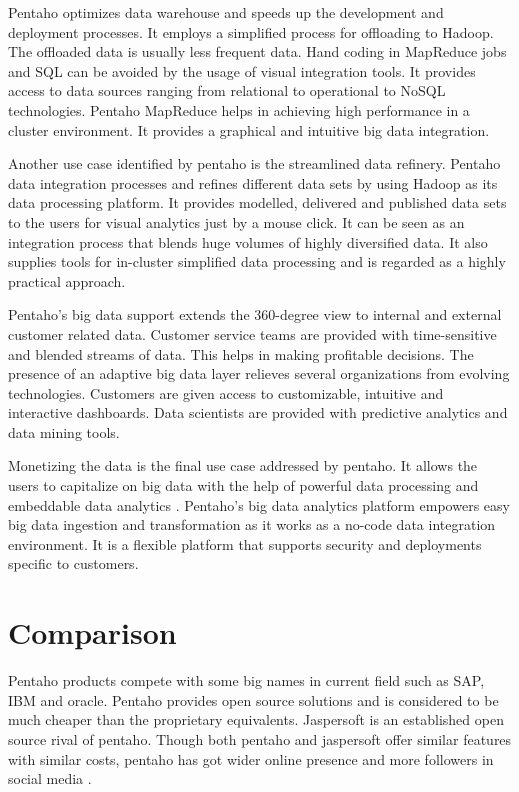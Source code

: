 \documentclass[9pt,twocolumn,twoside]{../../styles/osajnl}
\begin{document}
Pentaho optimizes data warehouse and speeds up the development and
deployment processes. It employs a simplified process for offloading
to Hadoop. The offloaded data is usually less frequent data. Hand
coding in MapReduce jobs and SQL can be avoided by the usage of visual
integration tools. It provides access to data sources ranging from
relational to operational to NoSQL technologies. Pentaho MapReduce
helps in achieving high performance in a cluster environment. It
provides a graphical and intuitive big data integration.

Another use case identified by pentaho is the streamlined data
refinery. Pentaho data integration processes and refines different
data sets by using Hadoop as its data processing platform. It provides
modelled, delivered and published data sets to the users for visual
analytics just by a mouse click. It can be seen as an integration
process that blends huge volumes of highly diversified data. It also
supplies tools for in-cluster simplified data processing and is
regarded as a highly practical approach.

Pentaho’s big data support extends the 360-degree view to internal and
external customer related data. Customer service teams are provided
with time-sensitive and blended streams of data. This helps in making
profitable decisions. The presence of an adaptive big data layer
relieves several organizations from evolving technologies. Customers
are given access to customizable, intuitive and interactive
dashboards. Data scientists are provided with predictive analytics and
data mining tools.

Monetizing the data is the final use case addressed by pentaho. It
allows the users to capitalize on big data with the help of powerful
data processing and embeddable data analytics \cite{pent9}. Pentaho’s
big data analytics platform empowers easy big data ingestion and
transformation as it works as a no-code data integration
environment. It is a flexible platform that supports security and
deployments specific to customers.

\section{Comparison}

Pentaho products compete with some big names in current field such as
SAP, IBM and oracle. Pentaho provides open source solutions and is
considered to be much cheaper than the proprietary
equivalents. Jaspersoft is an established open source rival of
pentaho. Though both pentaho and jaspersoft offer similar features
with similar costs, pentaho has got wider online presence and more
followers in social media \cite{pent10}.
\end{document}
